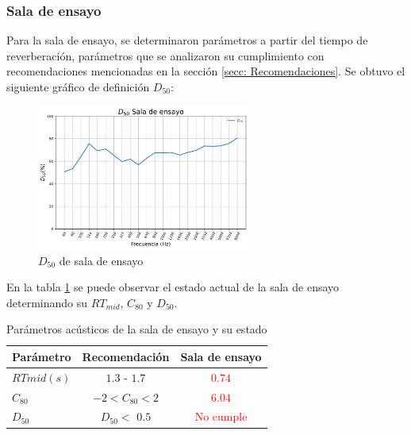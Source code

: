 \subsubsection{Sala de ensayo}
    Para la sala de ensayo, se determinaron parámetros a partir del tiempo de reverberación, parámetros que se analizaron su cumplimiento con recomendaciones mencionadas en la sección \ref{secc: Recomendaciones}.
    Se obtuvo el siguiente gráfico de definición $D_{50}$:
    \begin{figure}[H]
        \centering
        \includegraphics[width=7cm]{Imagenes/Resultados/D50_ensayo.png}
        \caption{$D_{50}$ de sala de ensayo}
    \end{figure}
    En la tabla \ref{tab:parametros acusticos sala ensayo} se puede observar el estado actual de la sala de ensayo determinando su $RT_{mid}$, $C_{80}$ y $D_{50}$.
    \begin{table}[H]
        \centering
        \begin{tabular}{|l|c|c|}
        \hline
        \textbf{Parámetro}& \textbf{Recomendación} & \textbf{Sala de ensayo}\\ \hline
        $RT{mid} (s)$ &  $1.3$ - $1.7$  & \textcolor{red}{$0.74$} \\ \hline
        $C_{80}$      & $-2<C_{80}<2$   & \textcolor{red}{$6.04$} \\\hline
        $D_{50}$      & $D_{50}<$ $0.5$   & \textcolor{red}{No cumple} \\\hline
        \end{tabular}
        \caption{Parámetros acústicos de la sala de ensayo y su estado}
        \label{tab:parametros acusticos sala ensayo}
    \end{table}

